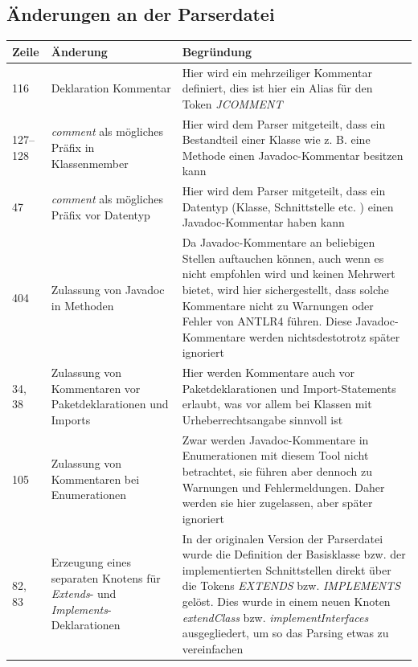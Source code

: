 
\renewcommand\appendixpagename{Anhänge}
\begin{appendices}


\chapter{Änderungen an der Parserdatei}\label{chapter:appendix_parser_changes}

\begin{table}[h!]
    \centering
    \begin{tabular}{m{0.75cm}|m{4cm}|m{10cm}}
        \textbf{Zeile} & \textbf{Änderung} & \textbf{Begründung} \\
         \hline
        116 & Deklaration Kommentar & Hier wird ein mehrzeiliger Kommentar definiert, dies ist hier ein Alias für den Token \textit{JCOMMENT}\\
        \hline
        127--128 & \textit{comment} als mögliches Präfix in Klassenmember & Hier wird dem Parser mitgeteilt, dass ein Bestandteil einer Klasse wie z. B. eine Methode einen Javadoc-Kommentar besitzen kann\\
        \hline
        47 & \textit{comment} als mögliches Präfix vor Datentyp & Hier wird dem Parser mitgeteilt, dass ein Datentyp (Klasse, Schnittstelle etc. ) einen Javadoc-Kommentar haben kann \\
        \hline
        404 & Zulassung von Javadoc in Methoden & Da Javadoc-Kommentare an beliebigen Stellen auftauchen können, auch wenn es nicht empfohlen wird und keinen Mehrwert bietet, wird hier sichergestellt, dass solche Kommentare nicht zu Warnungen oder Fehler von ANTLR4 führen. Diese Javadoc-Kommentare werden nichtsdestotrotz später ignoriert\\
        \hline
        34, 38& Zulassung von Kommentaren vor Paketdeklarationen und Imports & Hier werden Kommentare auch vor Paketdeklarationen und Import-Statements erlaubt, was vor allem bei Klassen mit Urheberrechtsangabe sinnvoll ist\\
        \hline
        105 & Zulassung von Kommentaren bei Enumerationen & Zwar werden Javadoc-Kommentare in Enumerationen mit diesem Tool nicht betrachtet, sie führen aber dennoch zu Warnungen und Fehlermeldungen. Daher werden sie hier zugelassen, aber später ignoriert \\
        \hline
        82, 83 & Erzeugung eines separaten Knotens für \textit{Extends}- und \textit{Implements}-Deklarationen & In der originalen Version der Parserdatei wurde die Definition der Basisklasse bzw. der implementierten Schnittstellen direkt über die Tokens \textit{EXTENDS} bzw. \textit{IMPLEMENTS} gelöst. Dies wurde in einem neuen Knoten \textit{extendClass} bzw. \textit{implementInterfaces} ausgegliedert, um so das Parsing etwas zu vereinfachen  \\
         

\end{tabular}
\end{table}
\end{appendices}
